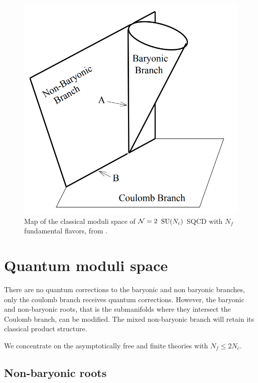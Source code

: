         \begin{figure}[H]
            \centering
            \includegraphics[scale=0.3]{Pictures/classicalmodulispace.png}
            \caption{Map of the classical moduli space of $\mathcal{N}=2$ $\text{SU}(N_c)$ SQCD with $N_f$ fundamental flavors, from \cite{Argyres_1996}.}
        \end{figure}

\section{Quantum moduli space}\label{secquantummodulispaceSU}

    There are no quantum corrections to the baryonic and non baryonic branches, only the coulomb branch receives quantum corrections. However, the baryonic and non-baryonic roots, that is the submanifolds where they intersect the Coulomb branch, can be modified. The mixed non-baryonic branch will retain its classical product structure.

    We concentrate on the asymptotically free and finite theories with $N_f\leq2N_c$.

    \subsection{Non-baryonic roots}

